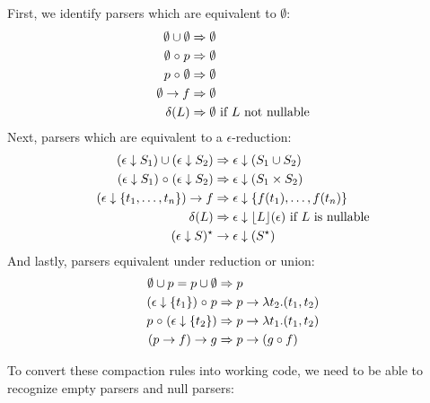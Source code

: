 First, we identify parsers which are equivalent to $\emptyset$:
%
\begin{align*}
  \emptyset \cup \emptyset &\mathrel{\Rightarrow} \emptyset
  \\
  \emptyset \mathrel{\circ} p &\mathrel{\Rightarrow} \emptyset
  \\
  p \mathrel{\circ} \emptyset &\mathrel{\Rightarrow} \emptyset
  \\
  \emptyset \to f &\mathrel{\Rightarrow} \emptyset
  \\
  \delta(L) &\mathrel{\Rightarrow} \emptyset \text{ if } L \text{ not nullable}
\end{align*}
%
Next, parsers which are equivalent to a $\epsilon$-reduction:
%
\begin{align*}
  (\epsilon \downarrow S_1) \cup (\epsilon \downarrow S_2) &\mathrel{\Rightarrow} \epsilon \downarrow (S_1 \cup S_2)
  \\
  (\epsilon \downarrow S_1) \mathrel{\circ} (\epsilon \downarrow S_2) &\mathrel{\Rightarrow} \epsilon \downarrow (S_1 \times S_2)
  \\
  (\epsilon \downarrow \{t_1, \ldots, t_n\}) \to f & \mathrel{\Rightarrow} \epsilon \downarrow
       \{ f(t_1), \ldots, f(t_n) \}
  \\
  \delta(L) &\mathrel{\Rightarrow} \epsilon \downarrow \lfloor L \rfloor (\epsilon) \text{ if } L \text{ is nullable}
  \\
  (\epsilon \downarrow S)^\star &\to \epsilon \downarrow (S^\star)
\end{align*}
%
And lastly, parsers equivalent under reduction or union:
%
\begin{align*}
  \emptyset \cup p = p \cup \emptyset &\mathrel{\Rightarrow} p
  \\
  (\epsilon \downarrow \left\{t_1\right\}) \mathrel{\circ} p &\mathrel{\Rightarrow} p \to \lambda t_2 .(t_1, t_2)
  \\
  p \mathrel{\circ} (\epsilon \downarrow \left\{t_2\right\}) &\mathrel{\Rightarrow} p \to \lambda t_1 .(t_1, t_2)
  \\
  (p \to f) \to g &\mathrel{\Rightarrow} p \to (g \circ f)
\end{align*}

%

To convert these compaction rules into working code, we need to be able to recognize empty parsers and null parsers:
%

